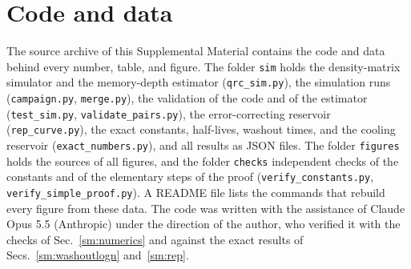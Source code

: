 \documentclass[aps,prl,twocolumn,superscriptaddress,floatfix]{revtex4-2}
\theoremstyle{plain}
\begin{document}
\section{Code and data}
\label{sm:code}

The source archive of this Supplemental Material contains the code and data behind every number, table, and figure. The folder \texttt{sim} holds the density-matrix simulator and the memory-depth estimator (\texttt{qrc\_sim.py}), the simulation runs (\texttt{campaign.py}, \texttt{merge.py}), the validation of the code and of the estimator (\texttt{test\_sim.py}, \texttt{validate\_pairs.py}), the error-correcting reservoir (\texttt{rep\_curve.py}), the exact constants, half-lives, washout times, and the cooling reservoir (\texttt{exact\_numbers.py}), and all results as JSON files. The folder \texttt{figures} holds the sources of all figures, and the folder \texttt{checks} independent checks of the constants and of the elementary steps of the proof (\texttt{verify\_constants.py}, \texttt{verify\_simple\_proof.py}). A README file lists the commands that rebuild every figure from these data. The code was written with the assistance of Claude Opus 5.5 (Anthropic) under the direction of the author, who verified it with the checks of Sec.~\ref{sm:numerics} and against the exact results of Secs.~\ref{sm:washoutlogn} and~\ref{sm:rep}.
\end{document}
